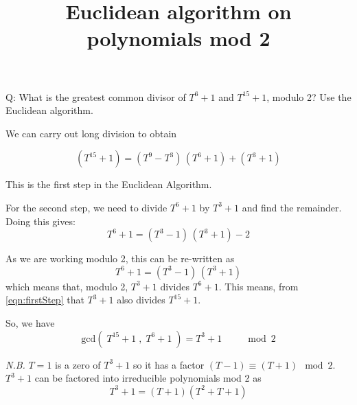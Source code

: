 \documentclass[11pt]{amsart}
\title{Euclidean algorithm on polynomials mod 2}
\begin{document}
\maketitle


Q: What is the greatest common divisor of $T^6 + 1$ and $T^{15} + 1$, modulo 2? Use the Euclidean algorithm.

\vspace{2em}

We can carry out long division to obtain

\begin{equation}
\label{eqn:firstStep}
(T^{15} + 1) = (T^9 - T^3) \, (T^6 + 1) + (T^3 + 1)
\end{equation}

This is the first step in the Euclidean Algorithm. 

For the second step, we need to divide $T^6 + 1$ by $T^3 + 1$ and find the remainder.
Doing this gives:
$$
T^6 + 1 = (T^3 - 1) \, (T^3 + 1) - 2
$$

As we are working modulo 2, this can be re-written as
$$
T^6 + 1 = (T^3 - 1) \, (T^3 + 1)
$$
which means that, modulo 2, $T^3 + 1$ divides $T^6 + 1$.
This means, from \cref{eqn:firstStep} that $T^3 + 1$ also divides $T^{15} + 1$.


So, we have 
$$
\text{gcd}(\; T^{15} + 1 \;, \; T^{6} + 1 \;) = T^{3} + 1 \qquad \mod 2
$$


\vspace{2em}

\emph{N.B.} $T=1$ is a zero of $T^{3} + 1$ so it has a factor $(T-1) \equiv (T+1) \mod 2$. $T^{3} + 1$ can be factored into irreducible polynomials mod 2 as
$$
T^{3} + 1 = (T+1) (T^2 + T + 1)
$$
\end{document}
